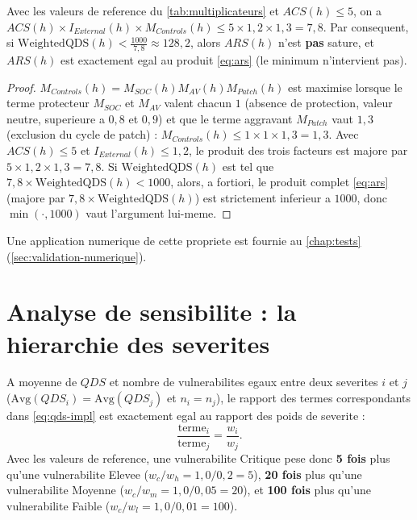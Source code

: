 \begin{propriete}
\label{prop:saturation}
Avec les valeurs de reference du \cref{tab:multiplicateurs} et $ACS(h)\le5$, on a
$ACS(h)\times I_{External}(h)\times M_{Controls}(h) \le 5\times1{,}2\times1{,}3=7{,}8$.
Par consequent, si $\mathrm{WeightedQDS}(h) < \tfrac{1000}{7{,}8}\approx128{,}2$,
alors $ARS(h)$ n'est \textbf{pas} sature, et $ARS(h)$ est exactement egal au produit
\cref{eq:ars} (le minimum n'intervient pas).
\end{propriete}

\begin{proof}
$M_{Controls}(h)=M_{SOC}(h)M_{AV}(h)M_{Patch}(h)$ est maximise lorsque le terme
protecteur $M_{SOC}$ et $M_{AV}$ valent chacun $1$ (absence de protection, valeur
neutre, superieure a $0{,}8$ et $0{,}9$) et que le terme aggravant $M_{Patch}$ vaut
$1{,}3$ (exclusion du cycle de patch) : $M_{Controls}(h)\le 1\times1\times1{,}3=1{,}3$.
Avec $ACS(h)\le5$ et $I_{External}(h)\le1{,}2$, le produit des trois facteurs est
majore par $5\times1{,}2\times1{,}3=7{,}8$. Si $\mathrm{WeightedQDS}(h)$ est tel que
$7{,}8\times\mathrm{WeightedQDS}(h) < 1000$, alors, a fortiori, le produit complet
\cref{eq:ars} (majore par $7{,}8\times \mathrm{WeightedQDS}(h)$) est strictement
inferieur a $1000$, donc $\min(\cdot,1000)$ vaut l'argument lui-meme.
\end{proof}

Une application numerique de cette propriete est fournie au \cref{chap:tests}
(\cref{sec:validation-numerique}).

\section{Analyse de sensibilite : la hierarchie des severites}

\begin{propriete}
\label{prop:ratio-severite}
A moyenne de $QDS$ et nombre de vulnerabilites egaux entre deux severites $i$ et $j$
($\mathrm{Avg}(QDS_i)=\mathrm{Avg}(QDS_j)$ et $n_i=n_j$), le rapport des termes
correspondants dans \cref{eq:qds-impl} est exactement egal au rapport des poids de
severite :
\[
\frac{\text{terme}_i}{\text{terme}_j} = \frac{w_i}{w_j}.
\]
Avec les valeurs de reference, une vulnerabilite Critique pese donc
\textbf{5 fois} plus qu'une vulnerabilite Elevee ($w_c/w_h=1{,}0/0{,}2=5$),
\textbf{20 fois} plus qu'une vulnerabilite Moyenne ($w_c/w_m=1{,}0/0{,}05=20$), et
\textbf{100 fois} plus qu'une vulnerabilite Faible ($w_c/w_l=1{,}0/0{,}01=100$).
\end{propriete}

